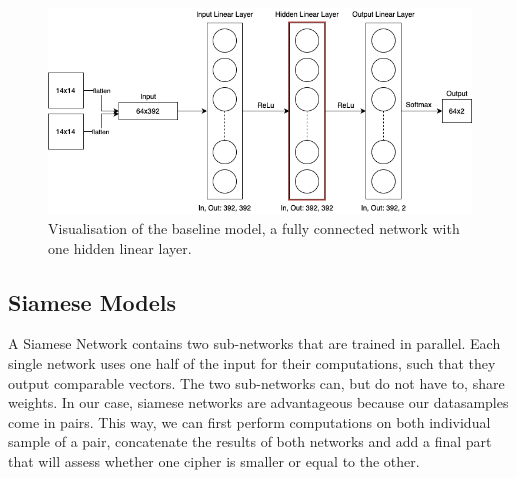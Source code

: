 \documentclass[10pt,conference,compsocconf]{IEEEtran}
\begin{document}
\begin{figure}[htbp]
  \centering
  \includegraphics[width=\columnwidth]{doc/project1-report/baseline.png}
  \vspace{-3mm}
  \caption[small]{Visualisation of the baseline model, a fully connected network with one hidden linear layer.}
  \label{fig:baseline}
\end{figure}


\subsection{Siamese Models}\label{subsec:siamese-models}
A Siamese Network contains two sub-networks that are trained in parallel. Each single network uses one half of the input for their computations, such that they output comparable vectors. The two sub-networks can, but do not have to, share weights. In our case, siamese networks are advantageous because our datasamples come in pairs. This way, we can first perform computations on both individual sample of a pair, concatenate the results of both networks and add a final part that will assess whether one cipher is smaller or equal to the other.
\end{document}
